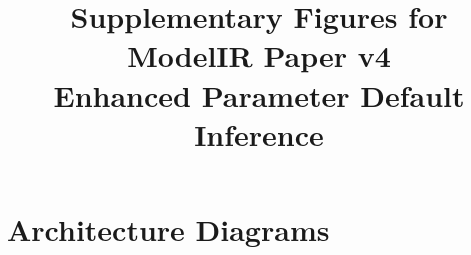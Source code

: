\documentclass[conference]{IEEEtran}
\begin{document}
\title{Supplementary Figures for ModelIR Paper v4\\Enhanced Parameter Default Inference}
\maketitle

\section{Architecture Diagrams}

\end{document}
